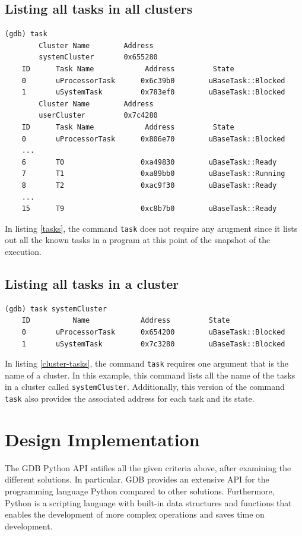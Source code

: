 \subsection{Listing all tasks in all clusters}
\begin{lstlisting}[caption={task command for displaying all tasks for all
clusters}, label={tasks},
basicstyle=\small]
(gdb) task
        Cluster Name        Address
        systemCluster       0x655280
    ID      Task Name            Address         State
    0       uProcessorTask      0x6c39b0        uBaseTask::Blocked
    1       uSystemTask         0x783ef0        uBaseTask::Blocked
        Cluster Name        Address
        userCluster         0x7c4280
    ID      Task Name            Address         State
    0       uProcessorTask      0x806e70        uBaseTask::Blocked
    ...
    6       T0                  0xa49830        uBaseTask::Ready
    7       T1                  0xa89bb0        uBaseTask::Running
    8       T2                  0xac9f30        uBaseTask::Ready
    ...
    15      T9                  0xc8b7b0        uBaseTask::Ready
\end{lstlisting}
In listing \ref{tasks}, the command \verb|task| does not require any
arugment since it lists out all the known tasks in a \uCPPS program at this
point of the snapshot of the execution.

\subsection{Listing all tasks in a cluster}
\begin{lstlisting}[caption={task command for displaying all tasks in a cluster}, label={cluster-tasks}]
(gdb) task systemCluster
    ID          Name            Address         State
    0       uProcessorTask      0x654200        uBaseTask::Blocked
    1       uSystemTask         0x7c3280        uBaseTask::Blocked
\end{lstlisting}
In listing \ref{cluster-tasks}, the command \verb|task| requires one argument
that is the name of a cluster. In this example, this command lists
all the name of the tasks in a cluster called \verb|systemCluster|.
Additionally, this version of the command \verb|task| also provides the associated address
for each task and its state.

\section{Design Implementation}
The GDB Python API satifies all the given criteria above, after examining the different solutions. In particular, GDB provides an extensive API for
the programming language Python compared to other solutions. Furthermore, Python is a scripting language with built-in
data structures and functions that enables the development of more complex
operations and saves time on development.

